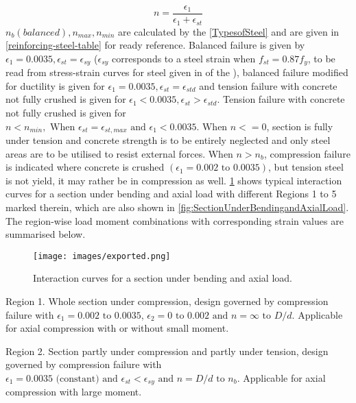 \begin{equation}
n=\frac{\epsilon_1}{\epsilon_1+\epsilon_{st}}
\label{TypesofSteel}
\end{equation}
$n_b (balanced), n_{max}, n_{min}$ are calculated by the
\eqn \ref{TypesofSteel} and are given in \tablem \ref{reinforcing-steel-table} for ready reference.
Balanced failure is given by
$\epsilon_1 = 0.0035, \epsilon_{st} =\epsilon_{sy}$ ($\epsilon_{sy}$
corresponds to a steel strain when $f_{st} = 0.87 f_y$, to be read from
stress-strain curves for steel given in  of the
), balanced failure modified for ductility is given for
$\epsilon_1 = 0.0035, \epsilon_{st} = \epsilon_{std}$ and tension failure
with concrete not fully crushed is given for
$\epsilon_1 < 0.0035, \epsilon_{st} > \epsilon_{std}$. Tension failure 
with concrete not fully crushed is given for $n < n_{min},\text{ When }
\epsilon_{st} = \epsilon_{st,max} \text{ and } \epsilon_1 < 0.0035.
\text{ When } n<= 0$, section is fully under tension and concrete
strength is to be entirely neglected and only steel areas are to be
utilised to resist external forces. When $n>n_b$, compression failure
is indicated where concrete is crushed $(\epsilon_1= 0.002 \text{ to } 0.0035)$,
but tension steel is not yield, it may rather be in compression as well.
\fig \ref{fig:Interactioncurves} shows typical interaction curves for a section under bending
and axial load with different Regions 1 to 5 marked therein, which are
also shown in \fig \ref{fig:SectionUnderBendingandAxialLoad}.
The region-wise load moment combinations with corresponding strain
values are summarised below.
\begin{figure}
\centering
\texttt{[image: images/exported.png]}
\caption{Interaction curves for a section under bending and axial load.}
\label{fig:Interactioncurves}
\end{figure}

Region 1. Whole section under compression, design governed by compression
failure with $\epsilon_1=0.002 \text{ to } 0.0035$, $\epsilon_2=0
\text{ to } 0.002 \text{ and } n=\infty \text{ to } D/d.$
Applicable for axial compression with or without small moment.

Region 2. Section partly under compression and partly under tension,
design governed by compression failure with
$\epsilon_1 = 0.0035 \text{ (constant) and } \epsilon_{st} < \epsilon_{sy}
\text{ and } n = D/d \text{ to } n_b.$ Applicable for axial compression with large moment.

